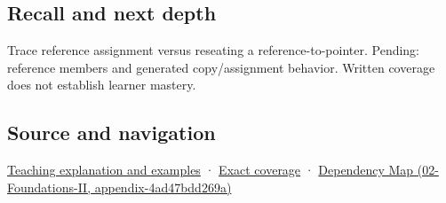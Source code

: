 \subsection{Recall and next depth}\label{appendix-d6d562ca9fbb-recall-and-next-depth}

Trace reference assignment versus reseating a reference-to-pointer. Pending: reference members and generated copy/assignment behavior. Written coverage does not establish learner mastery.

\subsection{Source and navigation}\label{appendix-d6d562ca9fbb-source-and-navigation}

\hyperref[01-foundations-i-ch003-giving-another-name-to-a-live-object]{Teaching explanation and examples} · \hyperref[appendix-fd090d982a15-m008---parts-113-126]{Exact coverage} · \href{../02-Foundations-II/main.pdf\#nameddest=appendix-4ad47bdd269a}{Dependency Map (02-Foundations-II, appendix-4ad47bdd269a)}

